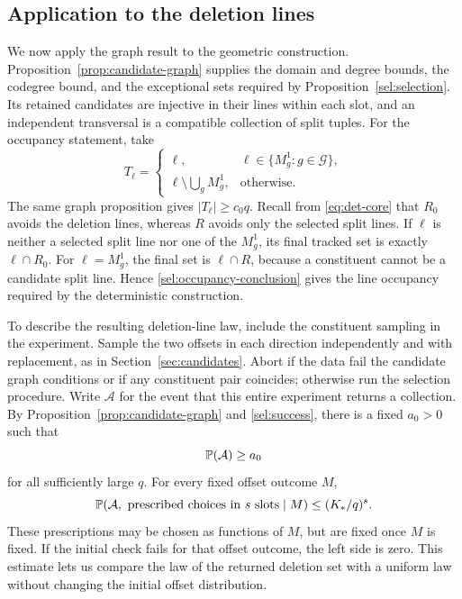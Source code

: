 \subsection{Application to the deletion lines}\label{sec:selection-application}

We now apply the graph result to the geometric construction.
Proposition~\ref{prop:candidate-graph} supplies the domain and degree
bounds, the codegree bound, and the exceptional sets required by
Proposition~\ref{sel:selection}.  Its retained candidates are
injective in their lines within each slot, and an independent
transversal is a compatible collection of split tuples.  For the
occupancy statement, take
\[
 T_\ell=
 \begin{cases}
  \ell,&\ell\in\{M_g^1:g\in\mathcal G\},\\
  \ell\setminus\bigcup_g M_g^1,&\text{otherwise}.
 \end{cases}
\]
The same graph proposition gives $|T_\ell|\ge c_0q$.  Recall from
\eqref{eq:det-core} that $R_0$ avoids the deletion lines, whereas
$R$ avoids only the selected split lines.  If $\ell$ is neither a
selected split line nor one of the $M_g^1$, its final tracked set is
exactly $\ell\cap R_0$.  For $\ell=M_g^1$, the final set is
$\ell\cap R$, because a constituent cannot be a candidate split
line.  Hence \eqref{sel:occupancy-conclusion} gives the line
occupancy required by the deterministic construction.

To describe the resulting deletion-line law, include the constituent
sampling in the experiment.  Sample the two offsets in each direction
independently and with replacement, as in
Section~\ref{sec:candidates}.  Abort if the data fail the candidate
graph conditions or if any constituent pair coincides; otherwise run
the selection procedure.  Write $\mathcal A$ for the event that this
entire experiment returns a collection.  By
Proposition~\ref{prop:candidate-graph} and \eqref{sel:success}, there
is a fixed $a_0>0$ such that
\begin{equation}\label{sel:unconditional-success}
 \mathbb P(\mathcal A)\ge a_0
\end{equation}
for all sufficiently large $q$.  For every fixed offset outcome $M$,
\begin{equation}\label{sel:conditional-offset-cylinder}
 \mathbb P(\mathcal A,\hbox{ prescribed choices in }s\hbox{ slots}\mid M)
 \le(K_*/q)^s.
\end{equation}
These prescriptions may be chosen as functions of $M$, but are fixed
once $M$ is fixed.  If the initial check fails for that offset outcome,
the left side is zero.  This estimate lets us compare the law of the
returned deletion set with a uniform law without changing the initial
offset distribution.

